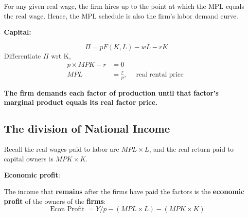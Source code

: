 \documentclass[12pt]{article}
\begin{document}
For any given real wage, the firm hires up to the point at which the MPL equals the 
real wage. Hence, the MPL schedule is also the firm’s labor demand curve.

\begin{figure}[H]
\end{figure}



{\textbf {Capital:}}

\begin{equation*}
\Pi = pF(K,L) - wL - rK
\end{equation*}
Differentiate $ \Pi $ wrt K,
\begin{align*}
p  \times MPK  - r &= 0\\
MPL &= \frac{r}{p}, \quad \text{ real rental price }
\end{align*}

{\textbf {The firm demands each factor of production until that factor’s marginal 
product equals its real factor price.}}


\subsection{The division of National Income}

Recall the real wages paid to labor are $ MPL  \times L $, and the real return paid to
capital owners is $ MPK  \times K $.

{\textbf {Economic profit}}:

The income that {\textbf {remains}} after the firms have paid the factors is the 
{\textbf {economic profit}} of the owners of the {\textbf {firms}}:
\begin{equation*}
\text{ Econ Profit } = Y/p - (MPL  \times L) - (MPK  \times K)
\end{equation*}
\end{document}
